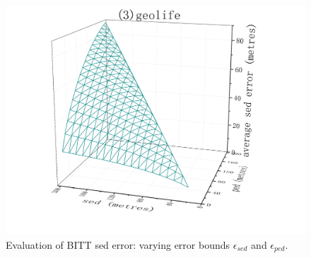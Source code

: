 {\begin{figure}[tb!]
	\includegraphics[scale = 0.210]{figures/Fig-BITT-geolife-sed-error.png}\hspace{1ex}
	\vspace{-2ex}
	\caption{\small Evaluation of BITT sed error: varying error bounds $\epsilon_{sed}$ and $\epsilon_{ped}$.}
	\label{fig:bitt-sed-error}
	\vspace{-1ex}
\end{figure}



}
